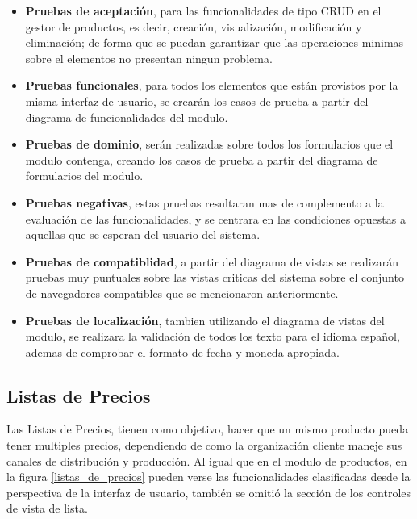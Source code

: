 \begin{itemize}
\item \textbf{Pruebas de aceptación}, para las funcionalidades de tipo CRUD en
    el gestor de productos, es decir, creación, visualización, modificación y
    eliminación; de forma que se puedan garantizar que las operaciones minimas
    sobre el elementos no presentan ningun problema.
\item \textbf{Pruebas funcionales}, para todos los elementos que están provistos
    por la misma interfaz de usuario, se crearán los casos de prueba a partir
    del diagrama de funcionalidades del modulo.
\item \textbf{Pruebas de dominio}, serán realizadas sobre todos los formularios
    que el modulo contenga, creando los casos de prueba a partir del diagrama
    de formularios del modulo.
\item \textbf{Pruebas negativas}, estas pruebas resultaran mas de complemento
    a la evaluación de las funcionalidades, y se centrara en las condiciones
    opuestas a aquellas que se esperan del usuario del sistema.
\item \textbf{Pruebas de compatiblidad}, a partir del diagrama de vistas se
    realizarán pruebas muy puntuales sobre las vistas criticas del sistema sobre
    el conjunto de navegadores compatibles que se mencionaron anteriormente.
\item \textbf{Pruebas de localización}, tambien utilizando el diagrama de vistas
    del modulo, se realizara la validación de todos los texto para el idioma
    español, ademas de comprobar el formato de fecha y moneda apropiada.
\end{itemize}

\subsection{Listas de Precios}
Las Listas de Precios, tienen como objetivo, hacer que un mismo producto pueda
tener multiples precios, dependiendo de como la organización cliente maneje sus
canales de distribución y producción. Al igual que en el modulo de productos, en
la figura \ref{listas_de_precios} pueden verse las funcionalidades clasificadas
desde la perspectiva de la interfaz de usuario, también se omitió la sección de
los controles de vista de lista.

